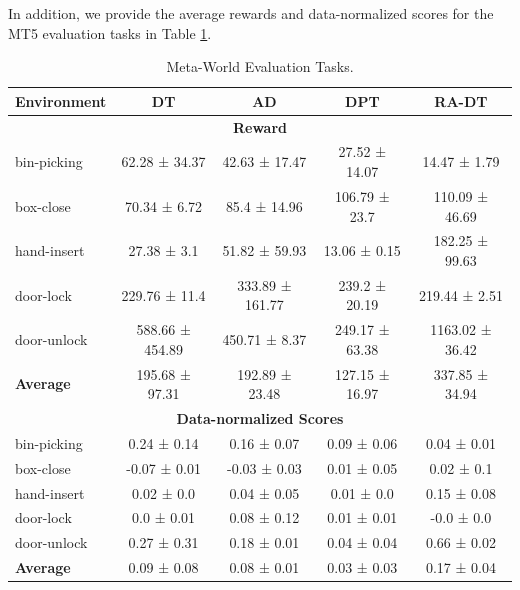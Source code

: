 In addition, we provide the average rewards and data-normalized scores for the MT5 evaluation tasks in Table \ref{tab:metaworld-eval}.

\begin{table}[h]
    \centering
    \caption{Meta-World Evaluation Tasks.}
\begin{tabular}{lcccc}
    \toprule
    \textbf{Environment} &  \textbf{DT} & \textbf{AD} & \textbf{DPT} & \textbf{RA-DT} \\
    \midrule
    \multicolumn{5}{c}{\textbf{Reward}} \\
bin-picking        &           62.28 ± 34.37 &          42.63 ± 17.47 &           27.52 ± 14.07 &          14.47 ± 1.79 \\
box-close          &            70.34 ± 6.72 &           85.4 ± 14.96 &           106.79 ± 23.7 &        110.09 ± 46.69 \\
hand-insert        &             27.38 ± 3.1 &          51.82 ± 59.93 &            13.06 ± 0.15 &        182.25 ± 99.63 \\
door-lock          &           229.76 ± 11.4 &        333.89 ± 161.77 &           239.2 ± 20.19 &         219.44 ± 2.51 \\
door-unlock        &         588.66 ± 454.89 &          450.71 ± 8.37 &          249.17 ± 63.38 &       1163.02 ± 36.42 \\
\textbf{Average}                            &          195.68 ± 97.31 &         192.89 ± 23.48 &          127.15 ± 16.97 &        337.85 ± 34.94 \\
\midrule
\multicolumn{5}{c}{\textbf{Data-normalized Scores}} \\
bin-picking &             0.24 ± 0.14 &            0.16 ± 0.07 &             0.09 ± 0.06 &           0.04 ± 0.01 \\
box-close   &            -0.07 ± 0.01 &           -0.03 ± 0.03 &             0.01 ± 0.05 &            0.02 ± 0.1 \\
hand-insert &              0.02 ± 0.0 &            0.04 ± 0.05 &              0.01 ± 0.0 &           0.15 ± 0.08 \\
door-lock   &              0.0 ± 0.01 &            0.08 ± 0.12 &             0.01 ± 0.01 &            -0.0 ± 0.0 \\
door-unlock &             0.27 ± 0.31 &            0.18 ± 0.01 &             0.04 ± 0.04 &           0.66 ± 0.02 \\
\textbf{Average}                              &             0.09 ± 0.08 &            0.08 ± 0.01 &             0.03 ± 0.03 &           0.17 ± 0.04 \\
\bottomrule
\end{tabular}
\label{tab:metaworld-eval}
\end{table}


